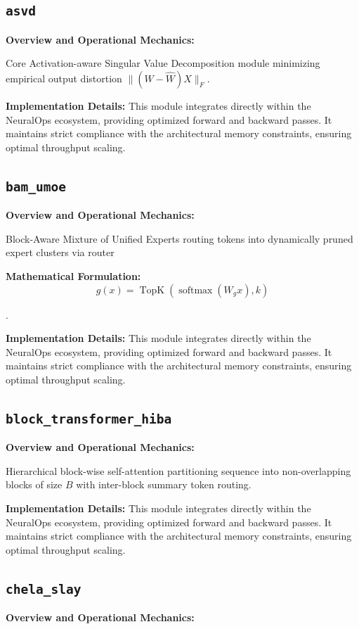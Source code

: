 \documentclass[10pt,twocolumn,letterpaper]{article}
\begin{document}
\subsection{\texttt{asvd}}
\textbf{Overview and Operational Mechanics:}

Core Activation-aware Singular Value Decomposition module minimizing empirical output distortion $\|(W - \hat{W}) X\|_F$.

\textbf{Implementation Details:}
This module integrates directly within the NeuralOps ecosystem, providing optimized forward and backward passes. It maintains strict compliance with the architectural memory constraints, ensuring optimal throughput scaling.

\subsection{\texttt{bam\_umoe}}
\textbf{Overview and Operational Mechanics:}

Block-Aware Mixture of Unified Experts routing tokens into dynamically pruned expert clusters via router

\textbf{Mathematical Formulation:}
\begin{equation}
g(x) = \operatorname{TopK}(\operatorname{softmax}(W_g x), k)
\end{equation}

.

\textbf{Implementation Details:}
This module integrates directly within the NeuralOps ecosystem, providing optimized forward and backward passes. It maintains strict compliance with the architectural memory constraints, ensuring optimal throughput scaling.

\subsection{\texttt{block\_transformer\_hiba}}
\textbf{Overview and Operational Mechanics:}

Hierarchical block-wise self-attention partitioning sequence into non-overlapping blocks of size $B$ with inter-block summary token routing.

\textbf{Implementation Details:}
This module integrates directly within the NeuralOps ecosystem, providing optimized forward and backward passes. It maintains strict compliance with the architectural memory constraints, ensuring optimal throughput scaling.

\subsection{\texttt{chela\_slay}}
\textbf{Overview and Operational Mechanics:}
\end{document}
